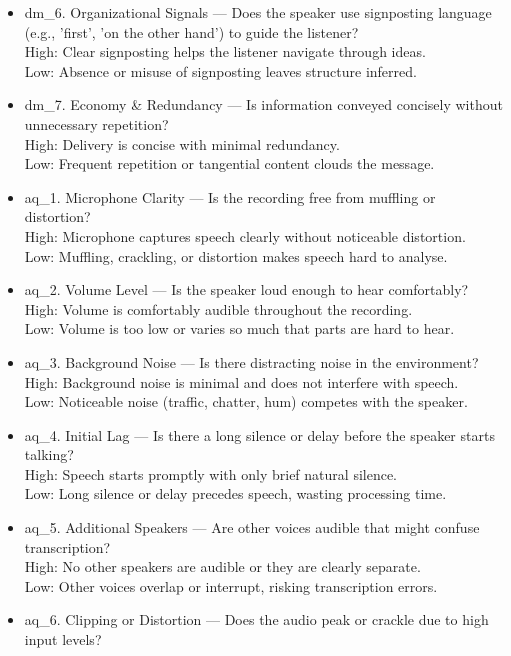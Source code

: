 \documentclass{report}
\begin{document}
\begin{tcolorbox}[breakable, colback=white, colframe=black, title=Revised Question Set Batch Prompt]
\begin{itemize}
  \item dm\_6. Organizational Signals — Does the speaker use signposting language (e.g., 'first', 'on the other hand') to guide the listener?\\
    High: Clear signposting helps the listener navigate through ideas.\\
    Low: Absence or misuse of signposting leaves structure inferred.
  \item dm\_7. Economy \& Redundancy — Is information conveyed concisely without unnecessary repetition?\\
    High: Delivery is concise with minimal redundancy.\\
    Low: Frequent repetition or tangential content clouds the message.
  \item aq\_1. Microphone Clarity — Is the recording free from muffling or distortion?\\
    High: Microphone captures speech clearly without noticeable distortion.\\
    Low: Muffling, crackling, or distortion makes speech hard to analyse.
  \item aq\_2. Volume Level — Is the speaker loud enough to hear comfortably?\\
    High: Volume is comfortably audible throughout the recording.\\
    Low: Volume is too low or varies so much that parts are hard to hear.
  \item aq\_3. Background Noise — Is there distracting noise in the environment?\\
    High: Background noise is minimal and does not interfere with speech.\\
    Low: Noticeable noise (traffic, chatter, hum) competes with the speaker.
  \item aq\_4. Initial Lag — Is there a long silence or delay before the speaker starts talking?\\
    High: Speech starts promptly with only brief natural silence.\\
    Low: Long silence or delay precedes speech, wasting processing time.
  \item aq\_5. Additional Speakers — Are other voices audible that might confuse transcription?\\
    High: No other speakers are audible or they are clearly separate.\\
    Low: Other voices overlap or interrupt, risking transcription errors.
  \item aq\_6. Clipping or Distortion — Does the audio peak or crackle due to high input levels?\\

\end{itemize}
\end{tcolorbox}
\end{document}
